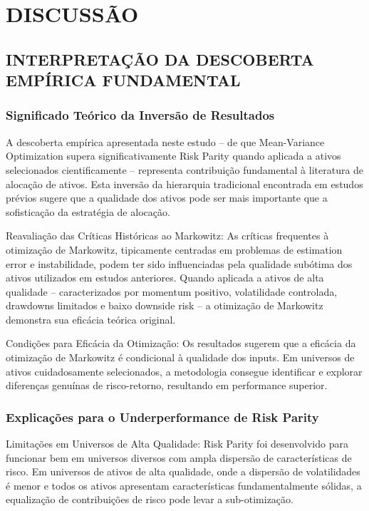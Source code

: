 
\chapter{DISCUSSÃO}

\section{INTERPRETAÇÃO DA DESCOBERTA EMPÍRICA FUNDAMENTAL}

\subsection{Significado Teórico da Inversão de Resultados}

A descoberta empírica apresentada neste estudo – de que Mean-Variance Optimization supera significativamente Risk Parity quando aplicada a ativos selecionados cientificamente – representa contribuição fundamental à literatura de alocação de ativos. Esta inversão da hierarquia tradicional encontrada em estudos prévios sugere que a qualidade dos ativos pode ser mais importante que a sofisticação da estratégia de alocação.

Reavaliação das Críticas Históricas ao Markowitz: As críticas frequentes à otimização de Markowitz, tipicamente centradas em problemas de estimation error e instabilidade, podem ter sido influenciadas pela qualidade subótima dos ativos utilizados em estudos anteriores. Quando aplicada a ativos de alta qualidade – caracterizados por momentum positivo, volatilidade controlada, drawdowns limitados e baixo downside risk – a otimização de Markowitz demonstra sua eficácia teórica original.

Condições para Eficácia da Otimização: Os resultados sugerem que a eficácia da otimização de Markowitz é condicional à qualidade dos inputs. Em universos de ativos cuidadosamente selecionados, a metodologia consegue identificar e explorar diferenças genuínas de risco-retorno, resultando em performance superior.

\subsection{Explicações para o Underperformance de Risk Parity}

Limitações em Universos de Alta Qualidade: Risk Parity foi desenvolvido para funcionar bem em universos diversos com ampla dispersão de características de risco. Em universos de ativos de alta qualidade, onde a dispersão de volatilidades é menor e todos os ativos apresentam características fundamentalmente sólidas, a equalização de contribuições de risco pode levar a sub-otimização.

